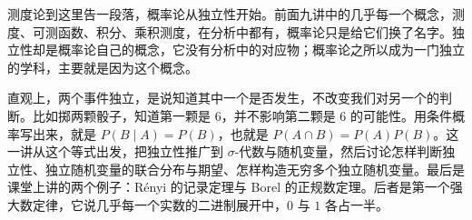 \label{lec:independence}

测度论到这里告一段落，概率论从独立性开始。前面九讲中的几乎每一个概念，测度、可测函数、积分、乘积测度，在分析中都有，概率论只是给它们换了名字。独立性却是概率论自己的概念，它没有分析中的对应物；概率论之所以成为一门独立的学科，主要就是因为这个概念。

直观上，两个事件独立，是说知道其中一个是否发生，不改变我们对另一个的判断。比如掷两颗骰子，知道第一颗是 $6$，并不影响第二颗是 $6$ 的可能性。用条件概率写出来，就是 $P(B\mid A)=P(B)$，也就是 $P(A\cap B)=P(A)P(B)$。这一讲从这个等式出发，把独立性推广到 $\sigma$-代数与随机变量，然后讨论怎样判断独立性、独立随机变量的联合分布与期望、怎样构造无穷多个独立随机变量。最后是课堂上讲的两个例子：Rényi 的记录定理与 Borel 的正规数定理。后者是第一个强大数定律，它说几乎每一个实数的二进制展开中，$0$ 与 $1$ 各占一半。


